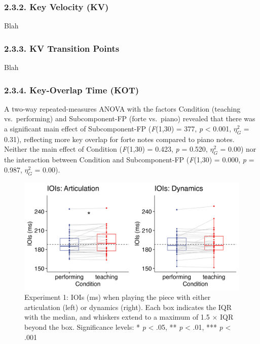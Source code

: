 \documentclass[
  english,
  man,floatsintext]{apa6}
\begin{document}
\hypertarget{key-velocity-kv-1}{%
\subsubsection{2.3.2. Key Velocity (KV)}\label{key-velocity-kv-1}}

Blah

\hypertarget{kv-transition-points-1}{%
\subsubsection{2.3.3. KV Transition Points}\label{kv-transition-points-1}}

Blah

\hypertarget{key-overlap-time-kot-1}{%
\subsubsection{2.3.4. Key-Overlap Time (KOT)}\label{key-overlap-time-kot-1}}

A two-way repeated-measures ANOVA with the factors Condition (teaching vs.~performing) and Subcomponent-FP (forte vs.~piano) revealed that there was a significant main effect of Subcomponent-FP (\emph{F}(1,30) = 377, \emph{p} \textless{} 0.001, \(\eta_G^2\) = 0.31), reflecting more key overlap for forte notes compared to piano notes. Neither the main effect of Condition (\emph{F}(1,30) = 0.423, \emph{p} = 0.520, \(\eta_G^2\) = 0.00) nor the interaction between Condition and Subcomponent-FP (\emph{F}(1,30) = 0.000, \emph{p} = 0.987, \(\eta_G^2\) = 0.00).

\begin{figure}
\includegraphics[width=1\linewidth]{manuscript_files/figure-latex/plot-ioi-1-1} \caption{\label{fig:ioi-1}Experiment 1: IOIs (ms) when playing the piece with either articulation (left) or dynamics (right). Each box indicates the IQR with the median, and whiskers extend to a maximum of 1.5 × IQR beyond the box. Significance levels: * \textit{p} < .05, ** \textit{p} < .01, *** \textit{p} < .001}\label{fig:plot-ioi-1}
\end{figure}
\end{document}
